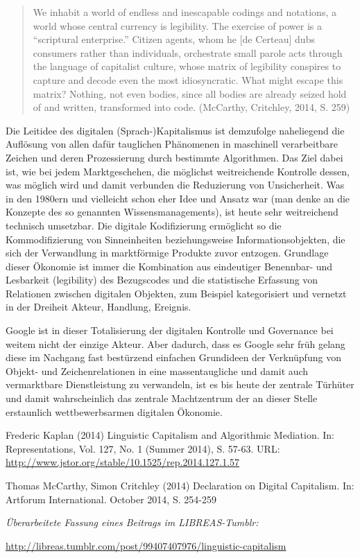 \documentclass[a4paper,
fontsize=11pt,
oneside,
numbers=noperiodatend,
parskip=half-,
bibliography=totoc,
final
]{scrartcl}
\begin{document}
\begin{quote}
We inhabit a world of endless and inescapable codings and notations, a
world whose central currency is legibility. The exercise of power is a
\enquote{scriptural enterprise.} Citizen agents, whom he {[}de
Certeau{]} dubs consumers rather than individuals, orchestrate small
parole acts through the language of capitalist culture, whose matrix of
legibility conspires to capture and decode even the most idiosyncratic.
What might escape this matrix? Nothing, not even bodies, since all
bodies are already seized hold of and written, transformed into code.
(McCarthy, Critchley, 2014, S. 259)
\end{quote}

Die Leitidee des digitalen (Sprach-)Kapitalismus ist demzufolge
naheliegend die Auflösung von allen dafür tauglichen Phänomenen in
maschinell verarbeitbare Zeichen und deren Prozessierung durch bestimmte
Algorithmen. Das Ziel dabei ist, wie bei jedem Marktgeschehen, die
möglichst weitreichende Kontrolle dessen, was möglich wird und damit
verbunden die Reduzierung von Unsicherheit. Was in den 1980ern und
vielleicht schon eher Idee und Ansatz war (man denke an die Konzepte des
so genannten Wissensmanagements), ist heute sehr weitreichend technisch
umsetzbar. Die digitale Kodifizierung ermöglicht so die Kommodifizierung
von Sinneinheiten beziehungsweise Informationsobjekten, die sich der
Verwandlung in marktförmige Produkte zuvor entzogen. Grundlage dieser
Ökonomie ist immer die Kombination aus eindeutiger Benennbar- und
Lesbarkeit (legibility) des Bezugscodes und die statistische Erfassung
von Relationen zwischen digitalen Objekten, zum Beispiel kategorisiert
und vernetzt in der Dreiheit Akteur, Handlung, Ereignis.

Google ist in dieser Totalisierung der digitalen Kontrolle und
Governance bei weitem nicht der einzige Akteur. Aber dadurch, dass es
Google sehr früh gelang diese im Nachgang fast bestürzend einfachen
Grundideen der Verknüpfung von Objekt- und Zeichenrelationen in eine
massentaugliche und damit auch vermarktbare Dienstleistung zu
verwandeln, ist es bis heute der zentrale Türhüter und damit
wahrscheinlich das zentrale Machtzentrum der an dieser Stelle
erstaunlich wettbewerbsarmen digitalen Ökonomie.

Frederic Kaplan (2014) Linguistic Capitalism and Algorithmic Mediation.
In: Representations, Vol. 127, No. 1 (Summer 2014), S. 57-63. URL:
\url{http://www.jstor.org/stable/10.1525/rep.2014.127.1.57}

Thomas McCarthy, Simon Critchley (2014) Declaration on Digital
Capitalism. In: Artforum International. October 2014, S. 254-259

\emph{Überarbeitete Fassung eines Beitrags im LIBREAS-Tumblr:}

\url{http://libreas.tumblr.com/post/99407407976/linguistic-capitalism}

\end{document}
